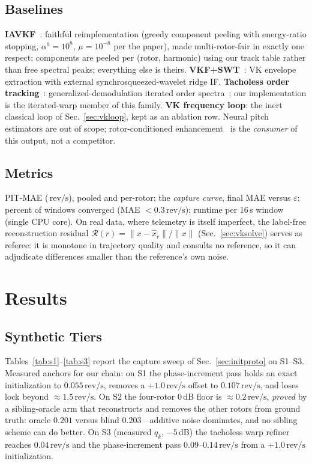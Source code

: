 \documentclass[journal]{IEEEtran}
\newcommand{\revps}{\ensuremath{\,\mathrm{rev/s}}}
\begin{document}
\subsection{Baselines}
\textbf{IAVKF}~\cite{jiang2024iavkf}: faithful reimplementation (greedy
component peeling with energy-ratio stopping, $\alpha^0 = 10^8$, $\mu =
10^{-8}$ per the paper), made multi-rotor-fair in exactly one respect:
components are peeled per (rotor, harmonic) using our track table rather
than free spectral peaks; everything else is theirs.
\textbf{VKF+SWT}~\cite{li2020vkswt}: VK envelope extraction with external
synchrosqueezed-wavelet ridge IF. \textbf{Tacholess order
tracking}~\cite{peeters2019tacholess}: generalized-demodulation iterated
order spectra~\cite{olhede2005generalized}; our implementation is the
iterated-warp member of this family. \textbf{VK frequency loop}: the
inert classical loop of Sec.~\ref{sec:vkloop}, kept as an ablation row.
Neural pitch estimators are out of scope; rotor-conditioned
enhancement~\cite{gulli2025rotorcond} is the \emph{consumer} of this
output, not a competitor.

\subsection{Metrics}
PIT-MAE (\revps), pooled and per-rotor; the \emph{capture curve}, final
MAE versus $\varepsilon$; percent of windows converged (MAE $<
0.3\revps$); runtime per 16\,s window (single CPU core). On real data,
where telemetry is itself imperfect, the label-free reconstruction
residual $\mathcal{R}(r) = \|x - \hat x_r\|/\|x\|$
(Sec.~\ref{sec:vksolve}) serves as referee: it is monotone in trajectory
quality and consults no reference, so it can adjudicate differences
smaller than the reference's own noise.

\section{Results}
\label{sec:results}

\subsection{Synthetic Tiers}

Tables~\ref{tab:s1}--\ref{tab:s3} report the capture sweep of
Sec.~\ref{sec:initproto} on S1--S3. Measured anchors for our chain: on S1
the phase-increment pass holds an exact initialization to $0.055\revps$,
removes a $+1.0\revps$ offset to $0.107\revps$, and loses lock beyond
${\approx}1.5\revps$. On S2 the four-rotor 0\,dB floor is
${\approx}0.2\revps$, \emph{proved} by a sibling-oracle arm that
reconstructs and removes the other rotors from ground truth: oracle
$0.201$ versus blind $0.203$---additive noise dominates, and no sibling
scheme can do better. On S3 (measured $q_k$, $-5$\,dB) the tacholess warp
refiner reaches $0.04\revps$ and the phase-increment pass
$0.09$--$0.14\revps$ from a $+1.0\revps$ initialization.
\end{document}
